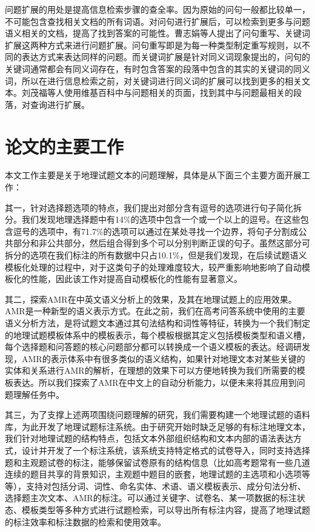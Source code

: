 \documentclass[master, winfont]{njuthesis}
\begin{document}
问题扩展的用处是提高信息检索步骤的查全率。因为原始的问句一般都比较单一，不可能包含查找相关文档的所有词语。对问句进行扩展后，可以检索到更多与问题语义相关的文档，提高了找到答案的可能性。曹志娟等人\cite{Cao2005QA}提出了问句重写、关键词扩展这两种方式来进行问题扩展。问句重写即是为每一种类型制定重写规则，以不同的表达方式来表达同样的问题。而关键词扩展是针对同义词现象提出的，问句的关键词通常都会有同义词存在，有时包含答案的段落中包含的其实的关键词的同义词，所以在进行信息检索之前，对关键词进行同义词的扩展可以找到更多的相关文本。刘茂福等人\cite{Liu2012QA}使用维基百科中与问题相关的页面，找到其中与问题最相关的段落，对查询进行扩展。

\section{论文的主要工作}
本文工作主要是关于地理试题文本的问题理解，具体是从下面三个主要方面开展工作：

其一，针对选择题选项的特点，我们提出对部分含有逗号的选项进行句子简化拆分。我们发现地理选择题中有14\%的选项中包含一个或一个以上的逗号。在这些包含逗号的选项中，有71.7\%的选项可以通过在某处寻找一个边界，将句子分割成公共部分和非公共部分，然后组合得到多个可以分别判断正误的句子。虽然这部分可拆分的选项在我们标注的所有数据中只占10.1\%，但是我们发现，在后续试题语义模板化处理的过程中，对于这类句子的处理难度较大，较严重影响地影响了自动模板化的性能，因此该工作对提高自动模板化的性能有显著意义。

其二，探索AMR在中英文语义分析上的效果，及其在地理试题上的应用效果。AMR是一种新型的语义表示方式。在此之前，我们在高考问答系统中使用的主要语义分析方法，是将试题文本通过其句法结构和词性等特征，转换为一个我们制定的地理试题模板体系中的模板表示，每个模板根据其定义包括模板类型和语义槽，每个选择题和问答题的核心问题部分都可以转换成一个语义模板的表达。经调研发现，AMR的表示体系中有很多类似的语义结构，如果针对地理文本对某些关键的实体和关系进行AMR的解析，在理想的效果下可以方便地转换为我们所需要的模板表达。所以我们探索了AMR在中文上的自动分析能力，以便未来将其应用到问题理解任务中。

其三，为了支撑上述两项围绕问题理解的研究，我们需要构建一个地理试题的语料库，为此开发了地理试题标注系统。由于研究开始时缺乏足够的有标注地理文本，我们针对地理试题的结构特点，包括文本外部组织结构和文本内部的语法表达方式，设计并开发了一个标注系统，该系统支持特定格式的试卷导入，同时支持选择题和主观题试卷的标注，能够保留试卷原有的结构信息（比如高考题常有一些几道连续的题目共享的背景知识，主观题中题目的嵌套，地理试题的主选项和小选项等等），支持对包括分词、词性、命名实体、术语、语义模板表示、成分句法分析、选择题主次文本、AMR的标注。可以通过关键字、试卷名、某一项数据的标注状态、模板类型等多种方式进行试题检索，可以导出所有标注内容，提高了地理试题的标注效率和标注数据的检索和使用效率。
\end{document}
